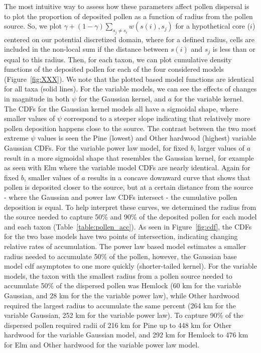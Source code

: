 \documentclass[12pt]{article}
\begin{document}
The most intuitive way to assess how these parameters affect pollen
dispersal is to plot the proportion of deposited pollen as a function
of radius from the pollen source. So, we plot $\gamma + (1- \gamma)
\sum_{s_j \neq s_i} w(s(i), s_j)$ for a hypothetical core ($i$)
centered on our potential discretized domain, where for a defined
radius, cells are included in the non-local sum if the distance
between $s(i)$ and $s_j$ is less than or equal to this radius. Then,
for each taxon, we can plot cumulative density functions of the
deposited pollen for each of the four considered models
(Figure~\ref{fig:XXX}). We note that the plotted based model functions
are identical for all taxa (solid lines).  For the variable models, we
can see the effects of changes in magnitude in both $\psi$ for the
Gaussian kernel, and $a$ for the variable kernel. The CDFs for the
Gaussian kernel models all have a sigmoidal shape, where smaller
values of $\psi$ correspond to a steeper slope indicating that
relatively more pollen deposition happens close to the source. The
contrast between the two most extreme $\psi$ values is seen the Pine
(lowest) and Other hardwood (highest) variable Gaussian CDFs. For the
variable power law model, for fixed $b$, larger values of $a$ result
in a more sigmoidal shape that resembles the Gaussian kernel, for
example as seen with Elm where the variable model CDFs are nearly
identical. Again for fixed $b$, smaller values of $a$ results in a
concave downward curve that shows that pollen is deposited closer to
the source, but at a certain distance from the source - where the
Gaussian and power law CDFs intersect - the cumulative pollen
deposition is equal. To help interpret these curves, we determined the
radius from the source needed to capture 50\% and 90\% of the
deposited pollen for each model and each taxon
(Table~\ref{table:pollen_acc}). As seen in Figure~\ref{fig:cdf}, the
CDFs for the two base models have two points of intersection,
indicating changing relative rates of accumulation. The power law
based model estimates a smaller radius needed to accumulate 50\% of
the pollen, however, the Gaussian base model cdf asymptotes to one
more quickly (shorter-tailed kernel). For the variable models, the
taxon with the smallest radius from a pollen source needed to
accumulate 50\% of the dispersed pollen was Hemlock (60 km for the
variable Gaussian, and 28 km for the the variable power law), while
Other hardwood required the largest radius to accumulate the same
percent (264 km for the variable Gaussian, 252 km for the variable
power law). To capture 90\% of the dispersed pollen required radii of
216 km for Pine up to 448 km for Other hardwood for the variable
Gaussian model, and 292 km for Hemlock to 476 km for Elm and Other
hardwood for the variable power law model.
\end{document}
